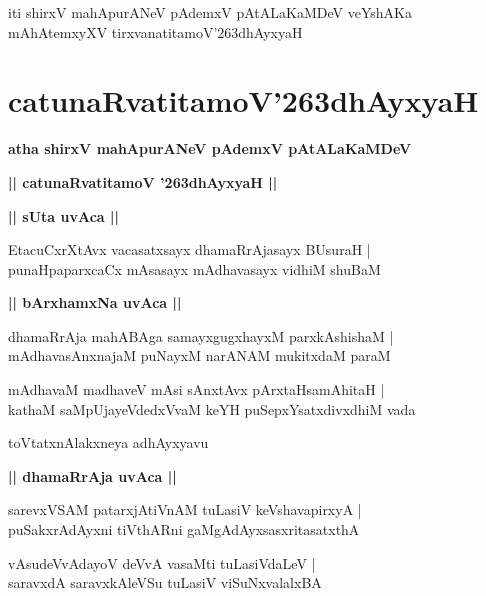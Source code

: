 \documentclass[twoside,12pt,openright]{book}
\def\S{\char'263}
\newcounter{shloka}[chapter]
\def\uvaca#1{\centerline{{\large\textbf{#1}}}}
\begin{document}
\begin{center}
iti shirxV mahApurANeV pAdemxV pAtALaKaMDeV veYshAKa mAhAtemxyXV 
tirxvanatitamoV\S dhAyxyaH
\end{center}

\chapter{catunaRvatitamoV\S dhAyxyaH}

\begin{center}
{\LARGE\bfseries atha shirxV mahApurANeV pAdemxV pAtALaKaMDeV }
\end{center}

\begin{center}         
{\LARGE\bfseries || catunaRvatitamoV \S dhAyxyaH ||}
\end{center}

\uvaca{|| sUta uvAca ||}

\begin{shloka}%
EtacuCxrXtAvx vacasatxsayx dhamaRrAjasayx BUsuraH |\\
punaHpaparxcaCx mAsasayx mAdhavasayx vidhiM shuBaM 
\end{shloka}

\uvaca{|| bArxhamxNa uvAca ||}

\begin{shloka}%
dhamaRrAja mahABAga samayxgugxhayxM parxkAshishaM |\\
mAdhavasAnxnajaM puNayxM narANAM mukitxdaM paraM 
\end{shloka}

\begin{shloka}%
mAdhavaM madhaveV mAsi sAnxtAvx pArxtaHsamAhitaH |\\
kathaM saMpUjayeVdedxVvaM keYH puSepxYsatxdivxdhiM vada
\end{shloka}

\begin{center}
toVtatxnAlakxneya adhAyxyavu
\end{center}

\uvaca{|| dhamaRrAja uvAca ||}

\begin{shloka}%
sarevxVSAM patarxjAtiVnAM tuLasiV keVshavapirxyA |\\
puSakxrAdAyxni tiVthARni gaMgAdAyxsasxritasatxthA 
\end{shloka}

\begin{shloka}%
vAsudeVvAdayoV deVvA vasaMti tuLasiVdaLeV |\\
saravxdA saravxkAleVSu tuLasiV viSuNxvalalxBA
\end{shloka}
\end{document}
